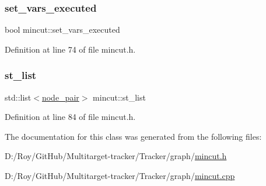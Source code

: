 \subsubsection{\texorpdfstring{set\+\_\+vars\+\_\+executed}{set\_vars\_executed}}
{\footnotesize\ttfamily bool mincut\+::set\+\_\+vars\+\_\+executed\hspace{0.3cm}{\ttfamily [protected]}}



Definition at line 74 of file mincut.\+h.

\mbox{\label{classmincut_a1ef91db99ffc99172ba5e1de2c452c81}} 
\subsubsection{\texorpdfstring{st\+\_\+list}{st\_list}}
{\footnotesize\ttfamily std\+::list$<$\mbox{\hyperlink{mincut_8h_a649cc9b1d7fcef0834a532960bc441a0}{node\+\_\+pair}}$>$ mincut\+::st\+\_\+list\hspace{0.3cm}{\ttfamily [protected]}}



Definition at line 84 of file mincut.\+h.



The documentation for this class was generated from the following files\+:\begin{DoxyCompactItemize}
\item 
D\+:/\+Roy/\+Git\+Hub/\+Multitarget-\/tracker/\+Tracker/graph/\mbox{\hyperlink{mincut_8h}{mincut.\+h}}\item 
D\+:/\+Roy/\+Git\+Hub/\+Multitarget-\/tracker/\+Tracker/graph/\mbox{\hyperlink{mincut_8cpp}{mincut.\+cpp}}\end{DoxyCompactItemize}
